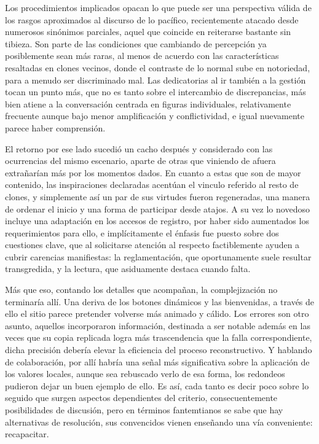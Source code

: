 \documentclass[
]{book}
\begin{document}
Los procedimientos implicados opacan lo que puede ser una perspectiva válida de los rasgos aproximados al discurso de lo pacífico, recientemente atacado desde numerosos sinónimos parciales, aquel que coincide en reiterarse bastante sin tibieza. Son parte de las condiciones que cambiando de percepción ya posiblemente sean más raras, al menos de acuerdo con las características resaltadas en clones vecinos, donde el contraste de lo normal sube en notoriedad, para a menudo ser discriminado mal. Las dedicatorias al ir también a la gestión tocan un punto más, que no es tanto sobre el intercambio de discrepancias, más bien atiene a la conversación centrada en figuras individuales, relativamente frecuente aunque bajo menor amplificación y conflictividad, e igual nuevamente parece haber comprensión.

El retorno por ese lado sucedió un cacho después y considerado con las ocurrencias del mismo escenario, aparte de otras que viniendo de afuera extrañarían más por los momentos dados. En cuanto a estas que son de mayor contenido, las inspiraciones declaradas acentúan el vinculo referido al resto de clones, y simplemente así un par de sus virtudes fueron regeneradas, una manera de ordenar el inicio y una forma de participar desde atajos. A su vez lo novedoso incluye una adaptación en los accesos de registro, por haber sido aumentados los requerimientos para ello, e implícitamente el énfasis fue puesto sobre dos cuestiones clave, que al solicitarse atención al respecto factiblemente ayuden a cubrir carencias manifiestas: la reglamentación, que oportunamente suele resultar transgredida, y la lectura, que asiduamente destaca cuando falta.

Más que eso, contando los detalles que acompañan, la complejización no terminaría allí. Una deriva de los botones dinámicos y las bienvenidas, a través de ello el sitio parece pretender volverse más animado y cálido. Los errores son otro asunto, aquellos incorporaron información, destinada a ser notable además en las veces que su copia replicada logra más trascendencia que la falla correspondiente, dicha precisión debería elevar la eficiencia del proceso reconstructivo. Y hablando de colaboración, por allí habría una señal más significativa sobre la aplicación de los valores locales, aunque sea rebuscado verlo de esa forma, los redondeos pudieron dejar un buen ejemplo de ello. Es así, cada tanto es decir poco sobre lo seguido que surgen aspectos dependientes del criterio, consecuentemente posibilidades de discusión, pero en términos fantemtianos se sabe que hay alternativas de resolución, sus convencidos vienen enseñando una vía conveniente: recapacitar.
\end{document}
